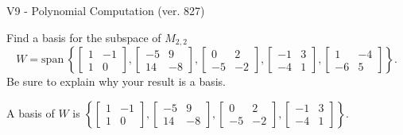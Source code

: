 \begin{exercise}
  \begin{exerciseTitle}V9 - Polynomial Computation (ver. 827)\end{exerciseTitle}
  \begin{exerciseStatement}
    Find a basis for the subspace of \(M_{2,2}\) 
\[W=\mathrm{span}\ \left\{\left[\begin{array}{cc}
1 & -1 \\
1 & 0
\end{array}\right] , \left[\begin{array}{cc}
-5 & 9 \\
14 & -8
\end{array}\right] , \left[\begin{array}{cc}
0 & 2 \\
-5 & -2
\end{array}\right] , \left[\begin{array}{cc}
-1 & 3 \\
-4 & 1
\end{array}\right] , \left[\begin{array}{cc}
1 & -4 \\
-6 & 5
\end{array}\right]\right\}.\]
 Be sure to explain why your result is a basis.


  \end{exerciseStatement}
  \begin{exerciseAnswer}
   A basis of \(W\) is  \(\left\{\left[\begin{array}{cc}
1 & -1 \\
1 & 0
\end{array}\right] , \left[\begin{array}{cc}
-5 & 9 \\
14 & -8
\end{array}\right] , \left[\begin{array}{cc}
0 & 2 \\
-5 & -2
\end{array}\right] , \left[\begin{array}{cc}
-1 & 3 \\
-4 & 1
\end{array}\right]\right\}\).
  


  \end{exerciseAnswer}
\end{exercise}